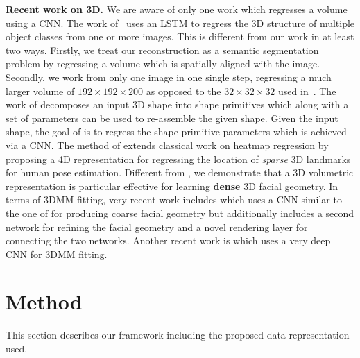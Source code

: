 \textbf{Recent work on 3D.} We are aware of only one
work which regresses a volume using a CNN. The work
of~\cite{choy20163d} uses an LSTM to regress the 3D structure of
multiple object classes from one or more images. This is different from our work in at least two ways. Firstly, we treat our reconstruction as a semantic segmentation problem by regressing a volume which is spatially aligned with the image. Secondly, we work from only one image in one single step, regressing a much larger volume of $192\times 192\times 200$ as opposed to the $32\times 32\times 32$ used in~\cite{choy20163d}. The work of \cite{tulsiani2016learning} decomposes an input 3D shape into shape primitives which along with a set of  parameters can be used to re-assemble the given shape. Given the input shape, the goal of \cite{tulsiani2016learning} is to regress the shape primitive parameters which is achieved via a CNN. The method of \cite{pavlakos2017coarse} extends classical work on heatmap regression \cite{tompson2015efficient, pfister2015flowing} by proposing a 4D representation for regressing the location of \textit{sparse} 3D landmarks for human pose estimation. Different from \cite{pavlakos2017coarse}, we demonstrate that a 3D volumetric representation is particular effective for learning \textbf{dense} 3D facial geometry. In terms of 3DMM fitting, very recent work includes  \cite{richardson2016learning} which uses a CNN similar to the one of \cite{zhu2016face} for producing coarse facial geometry but additionally includes a second network for refining the facial geometry and a novel rendering layer for connecting the two networks. Another recent work is \cite{tran2016regressing} which uses a very deep CNN for 3DMM fitting.



\section{Method}


This section describes our framework including the proposed data representation used.


